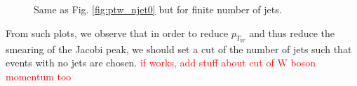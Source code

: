 \documentclass[a4paper]{report}
\numberwithin{equation}{section}
\begin{document}
\begin{figure}[htb!]
	\centering
	\quad
	\centering
	\quad
    \centering
	\quad
    \centering
	\quad
	\caption{Same as Fig. \ref{fig:ptw_njet0} but for finite number of jets. }
	\label{fig:ptw_njets}
\end{figure}

From such plots, we observe that in order to reduce $p_{T_W}$ and thus reduce the smearing of the Jacobi peak,
 we should set a cut of the number of jets such that events with no jets are chosen. \textcolor{red}{if works, add 
 stuff about cut of W boson momentum too}
 
\end{document}

